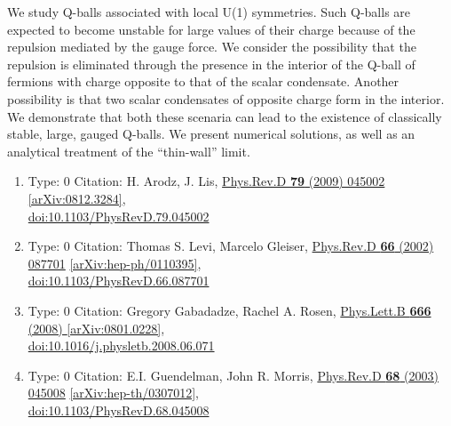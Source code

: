 \documentclass[a4paper,10pt]{article}
\begin{document}
\begin{enumerate}
We study Q-balls associated with local U(1) symmetries. Such Q-balls are expected to become unstable for large values of their charge because of the repulsion mediated by the gauge force. We consider the possibility that the repulsion is eliminated through the presence in the interior of the Q-ball of fermions with charge opposite to that of the scalar condensate. Another possibility is that two scalar condensates of opposite charge form in the interior. We demonstrate that both these scenaria can lead to the existence of classically stable, large, gauged Q-balls. We present numerical solutions, as well as an analytical treatment of the ``thin-wall'' limit.
\begin{enumerate}
  \item Type: 0 Citation: H. Arodz, J. Lis, \href{https://www.doi.org/10.1103/PhysRevD.79.045002}{Phys.Rev.D {\bf 79} (2009) 045002}  \href{https://arxiv.org/abs/0812.3284}{[arXiv:0812.3284]},\\\href{https://www.doi.org/10.1103/PhysRevD.79.045002}{doi:10.1103/PhysRevD.79.045002}
  \item Type: 0 Citation: Thomas S. Levi, Marcelo Gleiser, \href{https://www.doi.org/10.1103/PhysRevD.66.087701}{Phys.Rev.D {\bf 66} (2002) 087701}  \href{https://arxiv.org/abs/hep-ph/0110395}{[arXiv:hep-ph/0110395]},\\\href{https://www.doi.org/10.1103/PhysRevD.66.087701}{doi:10.1103/PhysRevD.66.087701}
  \item Type: 0 Citation: Gregory Gabadadze, Rachel A. Rosen, \href{https://www.doi.org/10.1016/j.physletb.2008.06.071}{Phys.Lett.B {\bf 666} (2008) }  \href{https://arxiv.org/abs/0801.0228}{[arXiv:0801.0228]},\\\href{https://www.doi.org/10.1016/j.physletb.2008.06.071}{doi:10.1016/j.physletb.2008.06.071}
  \item Type: 0 Citation: E.I. Guendelman, John R. Morris, \href{https://www.doi.org/10.1103/PhysRevD.68.045008}{Phys.Rev.D {\bf 68} (2003) 045008}  \href{https://arxiv.org/abs/hep-th/0307012}{[arXiv:hep-th/0307012]},\\\href{https://www.doi.org/10.1103/PhysRevD.68.045008}{doi:10.1103/PhysRevD.68.045008}

\end{enumerate}
\end{enumerate}
\end{document}
